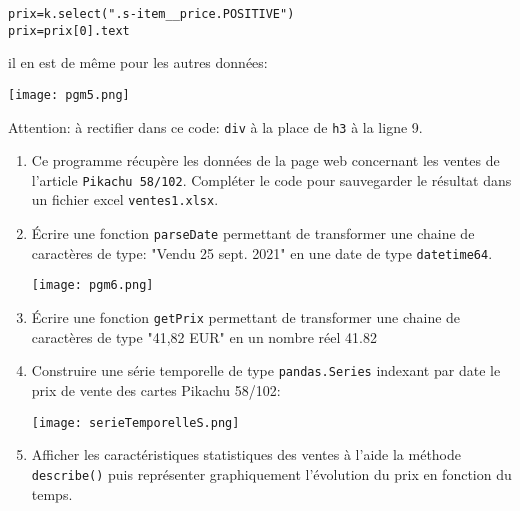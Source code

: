 \documentclass[a4paper]{article}
\begin{document}
\begin{verbatim}
prix=k.select(".s-item__price.POSITIVE")
prix=prix[0].text
\end{verbatim}
il en est de même pour les autres données:
\begin{center}
\texttt{[image: pgm5.png]} 
\end{center}
Attention: à rectifier dans ce code: {\tt div} à la place de  {\tt h3} à la ligne 9.
\begin{enumerate}
\item Ce programme récupère les données de la page web concernant les ventes de l'article {\tt Pikachu 58/102}. Compléter le code pour  sauvegarder le résultat dans un fichier excel {\tt ventes1.xlsx}.
\item Écrire une fonction {\tt parseDate} permettant de transformer une chaine de caractères de type: "Vendu  25 sept. 2021" en une date de type {\tt datetime64}.
\begin{center}
\texttt{[image: pgm6.png]} 
\end{center}
\item Écrire une fonction {\tt getPrix} permettant de transformer une chaine de caractères de type "41,82 EUR" en un nombre réel 41.82
\item Construire une série temporelle de type {\tt pandas.Series} indexant par date le prix de vente des cartes Pikachu 58/102:
\begin{center}
\texttt{[image: serieTemporelleS.png]} 
\end{center}
\item  Afficher les caractéristiques statistiques des ventes à l'aide la méthode {\tt describe()} puis représenter graphiquement l'évolution du prix en fonction du temps.
\end{enumerate}
\end{document}
